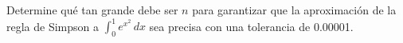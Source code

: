 \item Determine qué tan grande debe ser $n$ para garantizar que la aproximación de la regla de Simpson a $\int_{0}^{1} e^{x^2} \, dx$ sea precisa con una tolerancia de 0.00001.
